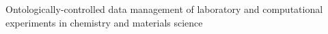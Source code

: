 Ontologically-controlled data management of laboratory and computational experiments in chemistry and materials science
